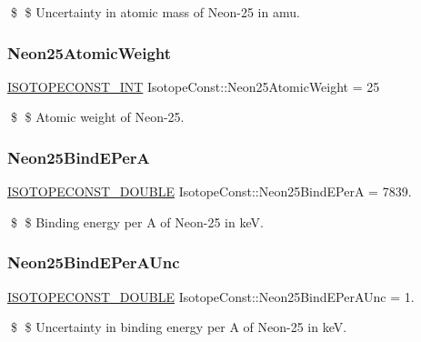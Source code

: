\$ \$ Uncertainty in atomic mass of Neon-\/25 in amu. \mbox{\label{group___isotope_const-_neon-_ne25_ga0c55caf86996002ffac99badfb792acf}} 
\subsubsection{\texorpdfstring{Neon25\+Atomic\+Weight}{Neon25AtomicWeight}}
{\footnotesize\ttfamily \mbox{\hyperlink{group___isotope_const-_macros_ga5f18360b3e99483a35c32d789e62621c}{I\+S\+O\+T\+O\+P\+E\+C\+O\+N\+S\+T\+\_\+\+I\+NT}} Isotope\+Const\+::\+Neon25\+Atomic\+Weight = 25}

\$ \$ Atomic weight of Neon-\/25. \mbox{\label{group___isotope_const-_neon-_ne25_ga23fc0c742ac21db54e941a062c2e7e8c}} 
\subsubsection{\texorpdfstring{Neon25\+Bind\+E\+PerA}{Neon25BindEPerA}}
{\footnotesize\ttfamily \mbox{\hyperlink{group___isotope_const-_macros_ga8f45a7272ce02c0b4c65c44636ed719a}{I\+S\+O\+T\+O\+P\+E\+C\+O\+N\+S\+T\+\_\+\+D\+O\+U\+B\+LE}} Isotope\+Const\+::\+Neon25\+Bind\+E\+PerA = 7839.}

\$ \$ Binding energy per A of Neon-\/25 in keV. \mbox{\label{group___isotope_const-_neon-_ne25_gac3558be36740d7a39b6701d653bcca85}} 
\subsubsection{\texorpdfstring{Neon25\+Bind\+E\+Per\+A\+Unc}{Neon25BindEPerAUnc}}
{\footnotesize\ttfamily \mbox{\hyperlink{group___isotope_const-_macros_ga8f45a7272ce02c0b4c65c44636ed719a}{I\+S\+O\+T\+O\+P\+E\+C\+O\+N\+S\+T\+\_\+\+D\+O\+U\+B\+LE}} Isotope\+Const\+::\+Neon25\+Bind\+E\+Per\+A\+Unc = 1.}

\$ \$ Uncertainty in binding energy per A of Neon-\/25 in keV. \mbox{\label{group___isotope_const-_neon-_ne25_gac6c32eeb314f6146995f8eb0619a9eba}} 
